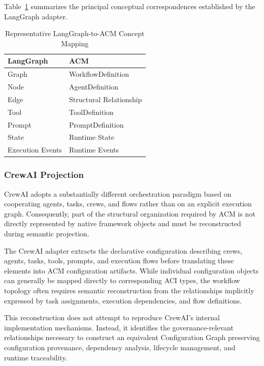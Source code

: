 \documentclass[10pt]{article}
\begin{document}
Table~\ref{tab:langgraph_mapping} summarizes the principal conceptual correspondences established by the LangGraph adapter.

\begin{table}[ht]
\centering
\caption{Representative LangGraph-to-ACM Concept Mapping}
\label{tab:langgraph_mapping}
\begin{tabular}{ll}
\toprule
\textbf{LangGraph} & \textbf{ACM} \\
\midrule
Graph & WorkflowDefinition \\
Node & AgentDefinition \\
Edge & Structural Relationship \\
Tool & ToolDefinition \\
Prompt & PromptDefinition \\
State & Runtime State \\
Execution Events & Runtime Events \\
\bottomrule
\end{tabular}
\end{table}

\subsubsection{CrewAI Projection}

CrewAI adopts a substantially different orchestration paradigm based on cooperating agents, tasks, crews, and flows rather than on an explicit execution graph. Consequently, part of the structural organization required by ACM is not directly represented by native framework objects and must be reconstructed during semantic projection.

The CrewAI adapter extracts the declarative configuration describing crews, agents, tasks, tools, prompts, and execution flows before translating these elements into ACM configuration artifacts. While individual configuration objects can generally be mapped directly to corresponding ACI types, the workflow topology often requires semantic reconstruction from the relationships implicitly expressed by task assignments, execution dependencies, and flow definitions.

This reconstruction does not attempt to reproduce CrewAI's internal implementation mechanisms. Instead, it identifies the governance-relevant relationships necessary to construct an equivalent Configuration Graph preserving configuration provenance, dependency analysis, lifecycle management, and runtime traceability.
\end{document}

